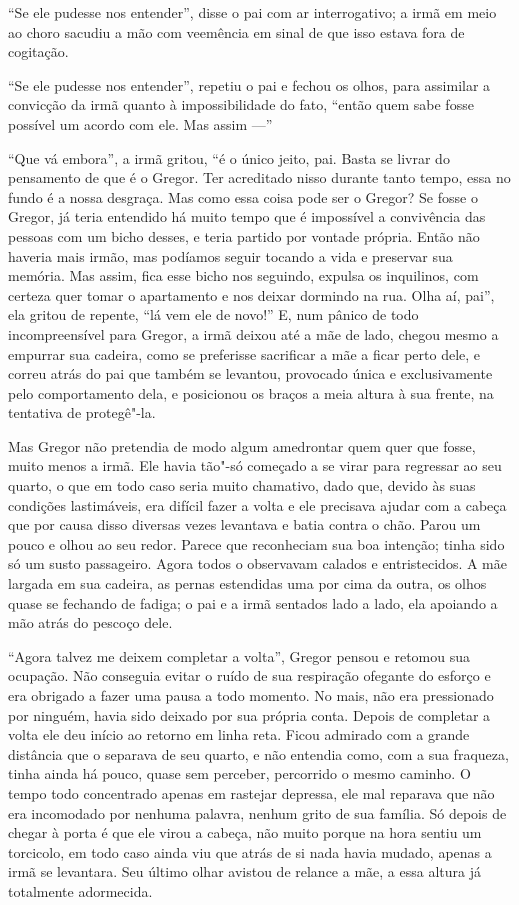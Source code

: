 “Se ele pudesse nos entender”, disse o pai com ar interrogativo; a irmã em
meio ao choro sacudiu a mão com veemência em sinal de que isso estava fora
de cogitação.

“Se ele pudesse nos entender”, repetiu o pai e fechou os olhos, para
assimilar a convicção da irmã quanto à impossibilidade do fato, “então
quem sabe fosse possível um acordo com ele. Mas assim ---”

“Que vá embora”, a irmã gritou, “é o único jeito, pai. Basta se livrar do
pensamento de que é o Gregor. Ter acreditado nisso durante tanto tempo,
essa no fundo é a nossa desgraça. Mas como essa coisa pode ser o Gregor?
Se fosse o Gregor, já teria entendido há muito tempo que é impossível a
convivência das pessoas com um bicho desses, e teria partido por vontade
própria. Então não haveria mais irmão, mas podíamos seguir tocando a vida
e preservar sua memória. Mas assim, fica esse bicho nos seguindo, expulsa
os inquilinos, com certeza quer tomar o apartamento e nos deixar dormindo
na rua. Olha aí, pai”, ela gritou de repente, “lá vem ele de novo!” E, num
pânico de todo incompreensível para Gregor, a irmã deixou até a mãe de
lado, chegou mesmo a empurrar sua cadeira, como se preferisse sacrificar a
mãe a ficar perto dele, e correu atrás do pai que também se levantou,
provocado única e exclusivamente pelo comportamento dela, e posicionou os
braços a meia altura à sua frente, na tentativa de protegê"-la.

Mas Gregor não pretendia de modo algum amedrontar quem quer que fosse,
muito menos a irmã. Ele havia tão"-só começado a se virar para regressar ao
seu quarto, o que em todo caso seria muito chamativo, dado que, devido às
suas condições lastimáveis, era difícil fazer a volta e ele precisava
ajudar com a cabeça que por causa disso diversas vezes levantava e
batia contra o chão. Parou um pouco e olhou ao seu redor. Parece que
reconheciam sua boa intenção; tinha sido só um susto passageiro. Agora
todos o observavam calados e entristecidos. A mãe largada em sua cadeira,
as pernas estendidas uma por cima da outra, os olhos quase se fechando de
fadiga; o pai e a irmã sentados lado a lado, ela apoiando a mão atrás do
pescoço dele.

“Agora talvez me deixem completar a volta”, Gregor pensou e retomou sua
ocupação. Não conseguia evitar o ruído de sua respiração ofegante do
esforço e era obrigado a fazer uma pausa a todo momento. No mais, não era
pressionado por ninguém, havia sido deixado por sua própria conta. Depois
de completar a volta ele deu início ao retorno em linha reta. Ficou
admirado com a grande distância que o separava de seu quarto, e não
entendia como, com a sua fraqueza, tinha ainda há pouco, quase sem
perceber, percorrido o mesmo caminho. O tempo todo concentrado apenas em
rastejar depressa, ele mal reparava que não era incomodado por nenhuma
palavra, nenhum grito de sua família. Só depois de chegar à porta é que
ele virou a cabeça, não muito porque na hora sentiu um torcicolo, em todo
caso ainda viu que atrás de si nada havia mudado, apenas a irmã se
levantara. Seu último olhar avistou de relance a mãe, a essa altura já
totalmente adormecida.

